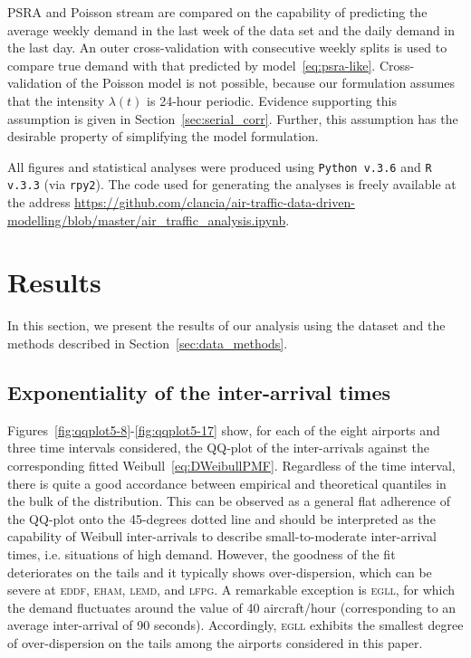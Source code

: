 \documentclass[]{elsarticle}
\makeatletter
\newcommand*{\ie}{i.e.\@\xspace}
\newcommand{\airp}[1]{\textcolor{#1}{\textsc{#1}}}
\makeatother
\begin{document}
\ac{PSRA} and Poisson stream are compared on the capability of predicting the average weekly demand in the last week of the data set and the daily demand in the last day.
An outer cross-validation with consecutive weekly splits is used to compare true demand with that predicted by model~\ref{eq:psra-like}.
Cross-validation of the Poisson model is not possible, because our formulation assumes that the intensity \(\lambda(t)\) is 24-hour periodic.
Evidence supporting this assumption is given in Section~\ref{sec:serial_corr}.
Further, this assumption has the desirable property of simplifying the model formulation.

All figures and statistical analyses were produced using \texttt{Python v.3.6} and \texttt{R v.3.3} (via \texttt{rpy2}). The code used for generating the analyses is freely available at the address \url{https://github.com/clancia/air-traffic-data-driven-modelling/blob/master/air_traffic_analysis.ipynb}.

\section{Results}\label{sec:results}

In this section, we present the results of our analysis using the dataset and the methods described in Section~\ref{sec:data_methods}.

\subsection{Exponentiality of the inter-arrival times}\label{sec:exp}

Figures~\ref{fig:qqplot5-8}-\ref{fig:qqplot5-17} show, for each of the eight airports and three time intervals considered, the QQ-plot of the inter-arrivals against the corresponding fitted Weibull~\eqref{eq:DWeibullPMF}.
Regardless of the time interval, there is quite a good accordance between empirical and theoretical quantiles in the bulk of the distribution.
This can be observed as a general flat adherence of the QQ-plot onto the 45-degrees dotted line and should be interpreted as the capability of Weibull inter-arrivals to describe small-to-moderate inter-arrival times, \ie{} situations of high demand.
However, the goodness of the fit deteriorates on the tails and it typically shows over-dispersion, which can be severe at \airp{eddf}, \airp{eham}, \airp{lemd}, and \airp{lfpg}.
A remarkable exception is \airp{egll}, for which the demand fluctuates around the value of 40 aircraft/hour (corresponding to an average inter-arrival of 90 seconds).
Accordingly, \airp{egll} exhibits the smallest degree of over-dispersion on the tails among the airports considered in this paper.
\end{document}

